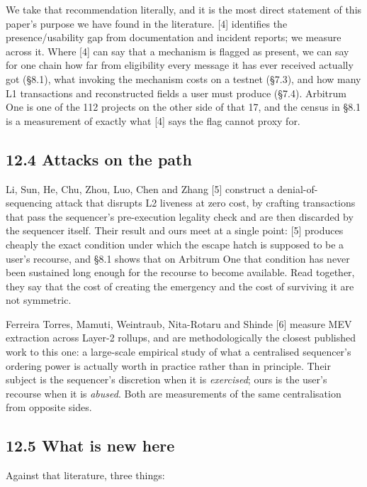 \documentclass[conference]{IEEEtran}
\renewcommand{\_}{\textunderscore\allowbreak}
\begin{document}
We take that recommendation literally, and it is the most direct
statement of this paper's purpose we have found in the literature.
{[}4{]} identifies the presence/usability gap from documentation and
incident reports; we measure across it. Where {[}4{]} can say that a
mechanism is flagged as present, we can say for one chain how far from
eligibility every message it has ever received actually got (§8.1), what
invoking the mechanism costs on a testnet (§7.3), and how many L1
transactions and reconstructed fields a user must produce (§7.4).
Arbitrum One is one of the 112 projects on the other side of that 17,
and the census in §8.1 is a measurement of exactly what {[}4{]} says the
flag cannot proxy for.

\subsection{12.4 Attacks on the path}\label{attacks-on-the-path}

Li, Sun, He, Chu, Zhou, Luo, Chen and Zhang {[}5{]} construct a
denial-of-sequencing attack that disrupts L2 liveness at zero cost, by
crafting transactions that pass the sequencer's pre-execution legality
check and are then discarded by the sequencer itself. Their result and
ours meet at a single point: {[}5{]} produces cheaply the exact
condition under which the escape hatch is supposed to be a user's
recourse, and §8.1 shows that on Arbitrum One that condition has never
been sustained long enough for the recourse to become available. Read
together, they say that the cost of creating the emergency and the cost
of surviving it are not symmetric.

Ferreira Torres, Mamuti, Weintraub, Nita-Rotaru and Shinde {[}6{]}
measure MEV extraction across Layer-2 rollups, and are methodologically
the closest published work to this one: a large-scale empirical study of
what a centralised sequencer's ordering power is actually worth in
practice rather than in principle. Their subject is the sequencer's
discretion when it is \emph{exercised}; ours is the user's recourse when
it is \emph{abused}. Both are measurements of the same centralisation
from opposite sides.

\subsection{12.5 What is new here}\label{what-is-new-here}

Against that literature, three things:
\end{document}
